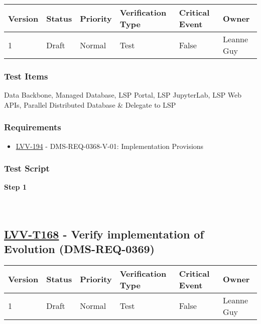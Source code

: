 \begin{longtable}[]{@{}llllll@{}}
\toprule
Version & Status & Priority & Verification Type & Critical Event &
Owner\tabularnewline
\midrule
\endhead
1 & Draft & Normal & Test & False & Leanne Guy\tabularnewline
\bottomrule
\end{longtable}

\hypertarget{test-items-67}{%
\subsubsection{Test Items}\label{test-items-67}}

Data Backbone, Managed Database, LSP Portal, LSP JupyterLab, LSP Web
APIs, Parallel Distributed Database \& Delegate to LSP

\hypertarget{requirements-67}{%
\subsubsection{Requirements}\label{requirements-67}}

\begin{itemize}
\tightlist
\item
  \href{https://jira.lsstcorp.org/browse/LVV-194}{LVV-194} -
  DMS-REQ-0368-V-01: Implementation Provisions
\end{itemize}

\hypertarget{test-script-67}{%
\subsubsection{Test Script}\label{test-script-67}}

\textbf{Step 1}\\
~\\
~\\

\hypertarget{lvv-t168---verify-implementation-of-evolution-dms-req-0369}{%
\subsection{\texorpdfstring{\href{https://jira.lsstcorp.org/secure/Tests.jspa\#/testCase/LVV-T168}{LVV-T168}
- Verify implementation of Evolution
(DMS-REQ-0369)}{LVV-T168 - Verify implementation of Evolution (DMS-REQ-0369)}}\label{lvv-t168---verify-implementation-of-evolution-dms-req-0369}}

\begin{longtable}[]{@{}llllll@{}}
\toprule
Version & Status & Priority & Verification Type & Critical Event &
Owner\tabularnewline
\midrule
\endhead
1 & Draft & Normal & Test & False & Leanne Guy\tabularnewline
\bottomrule
\end{longtable}

